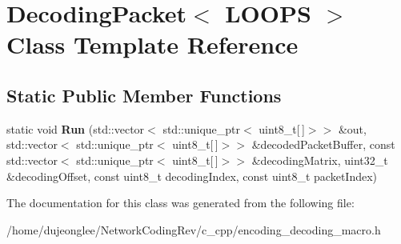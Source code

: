 \hypertarget{class_decoding_packet}{}\section{Decoding\+Packet$<$ L\+O\+O\+PS $>$ Class Template Reference}
\label{class_decoding_packet}
\subsection*{Static Public Member Functions}
\begin{DoxyCompactItemize}
\item 
static void {\bfseries Run} (std\+::vector$<$ std\+::unique\+\_\+ptr$<$ uint8\+\_\+t\mbox{[}$\,$\mbox{]}$>$$>$ \&out, std\+::vector$<$ std\+::unique\+\_\+ptr$<$ uint8\+\_\+t\mbox{[}$\,$\mbox{]}$>$$>$ \&decoded\+Packet\+Buffer, const std\+::vector$<$ std\+::unique\+\_\+ptr$<$ uint8\+\_\+t\mbox{[}$\,$\mbox{]}$>$$>$ \&decoding\+Matrix, uint32\+\_\+t \&decoding\+Offset, const uint8\+\_\+t decoding\+Index, const uint8\+\_\+t packet\+Index)\hypertarget{class_decoding_packet_afc9daa4ba02b54de271640b2bf368580}{}\label{class_decoding_packet_afc9daa4ba02b54de271640b2bf368580}

\end{DoxyCompactItemize}


The documentation for this class was generated from the following file\+:\begin{DoxyCompactItemize}
\item 
/home/dujeonglee/\+Network\+Coding\+Rev/c\+\_\+cpp/encoding\+\_\+decoding\+\_\+macro.\+h\end{DoxyCompactItemize}
